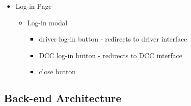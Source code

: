 \documentclass[10pt, onecolumn]{witseiepaper}
\begin{document}
\begin{itemize}
\begin{itemize}
\begin{itemize}
\end{itemize}
\end{itemize}
\item Log-in Page
\begin{itemize}
\item Log-in modal
\begin{itemize}
\item driver log-in button - redirects to driver interface
\item DCC log-in button - redirects to DCC interface
\item close button\\
\end{itemize}
\end{itemize}
\end{itemize}


\subsection{Back-end Architecture}
\end{document}
